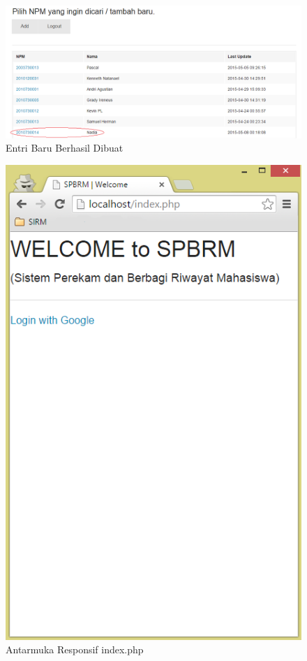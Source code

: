 \begin{figure}[H]
\centering
\includegraphics[scale=0.5]{Gambar/pengujian16.png}
\caption[Entri Baru Berhasil Dibuat]{Entri Baru Berhasil Dibuat} 
\label{fig:entribaruberhasil}
\end{figure}

\begin{figure}[H]
\centering
\includegraphics[scale=0.5]{Gambar/pengujian17.png}
\caption[Antarmuka Responsif index.php]{Antarmuka Responsif index.php} 
\label{fig:responsifindex}
\end{figure}

